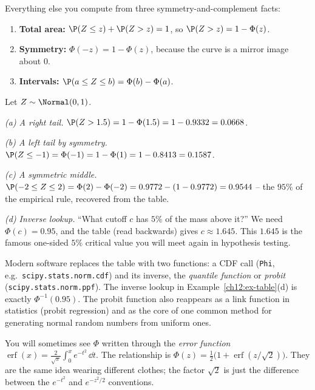 Everything else you compute from three symmetry-and-complement facts:

\begin{focusbox}
\begin{enumerate}
  \item \textbf{Total area:} $\P(Z \le z) + \P(Z > z) = 1$, so $\P(Z > z) = 1 - \Phi(z)$.
  \item \textbf{Symmetry:} $\Phi(-z) = 1 - \Phi(z)$, because the curve is a mirror
  image about $0$.
  \item \textbf{Intervals:} $\P(a \le Z \le b) = \Phi(b) - \Phi(a)$.
\end{enumerate}
\end{focusbox}

\begin{example}
\label{ch12:ex-table}
Let $Z \sim \Normal(0,1)$.

\emph{(a) A right tail.} $\P(Z > 1.5) = 1 - \Phi(1.5) = 1 - 0.9332 = 0.0668$.

\emph{(b) A left tail by symmetry.} $\P(Z \le -1) = \Phi(-1) = 1 - \Phi(1) =
1 - 0.8413 = 0.1587$.

\emph{(c) A symmetric middle.} $\P(-2 \le Z \le 2) = \Phi(2) - \Phi(-2)
= 0.9772 - (1 - 0.9772) = 0.9544$ -- the $95\%$ of the empirical rule, recovered
from the table.

\emph{(d) Inverse lookup.} ``What cutoff $c$ has $5\%$ of the mass above it?'' We
need $\Phi(c) = 0.95$, and the table (read backwards) gives $c \approx 1.645$.
This $1.645$ is the famous one-sided $5\%$ critical value you will meet again in
hypothesis testing.
\end{example}

\begin{connectionbox}
Modern software replaces the table with two functions: a CDF call (\texttt{Phi},
e.g.\ \texttt{scipy.stats.norm.cdf}) and its inverse, the \emph{quantile function}
or \emph{probit} (\texttt{scipy.stats.norm.ppf}). The inverse lookup in
Example~\ref{ch12:ex-table}(d) is exactly $\Phi^{-1}(0.95)$. The probit function
also reappears as a link function in statistics (probit regression) and as the
core of one common method for generating normal random numbers from uniform ones.
\end{connectionbox}

\begin{remark}
\label{ch12:erf}
You will sometimes see $\Phi$ written through the \emph{error function}
$\operatorname{erf}(x) = \frac{2}{\sqrt{\pi}}\int_0^x e^{-t^2}\,\dd t$. The
relationship is $\Phi(z) = \tfrac{1}{2}\big(1 + \operatorname{erf}(z/\sqrt{2})\big)$.
They are the same idea wearing different clothes; the factor $\sqrt{2}$ is just
the difference between the $e^{-t^2}$ and $e^{-z^2/2}$ conventions.
\end{remark}

